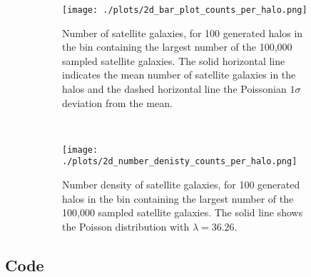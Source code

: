 \begin{figure}[ht!]
  
  \begin{subfigure}[t]{0.49\textwidth}\centering
    
    \texttt{[image: ./plots/2d\_bar\_plot\_counts\_per\_halo.png]}
    \caption{Number of satellite galaxies, for 100 generated halos in the bin containing the largest number of the 100,000 sampled satellite galaxies. The solid horizontal line indicates the mean number of satellite galaxies in the halos and the dashed horizontal line the Poissonian $1\sigma$ deviation from the mean.}
    \label{fig:2d1}
  \end{subfigure}
    ~
  \begin{subfigure}[t]{0.49\textwidth}\centering
    \texttt{[image: ./plots/2d\_number\_denisty\_counts\_per\_halo.png]}
    \caption{Number density of satellite galaxies, for 100 generated halos in the bin containing the largest number of the 100,000 sampled satellite galaxies. The solid line shows the Poisson distribution with $\lambda =  36.26$.}
    \label{fig:2d1}
  \end{subfigure}
  \caption{}
\end{figure}

\newpage

\subsection*{Code}




\newpage
